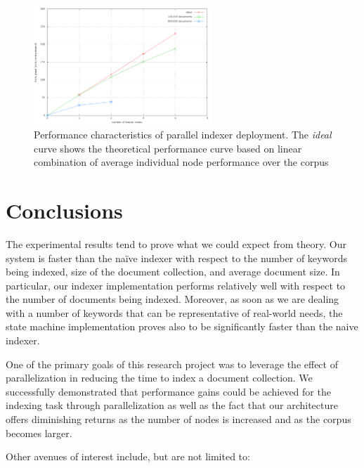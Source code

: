 \documentclass[10pt]{article}
\begin{document}
\begin{figure}
  \begin{center}
        \includegraphics[width=0.60\textwidth,height=!]{parallelization}
  \end{center}
  \caption{Performance characteristics of parallel indexer
    deployment. The \textit{ideal} curve shows the theoretical
    performance curve based on linear combination of average
    individual node performance over the corpus} 
\end{figure} 


\section{Conclusions}
\label{sec:conclusions}
The experimental results tend to prove what we could expect from
theory. Our system is faster than the na\"{i}ve indexer with respect
to the number of keywords being indexed, size of the document
collection, and average document size. In particular, our indexer
implementation performs relatively well with respect to the number of
documents being indexed. Moreover, as soon as we are dealing with a number of
keywords that can be representative of real-world needs, the state
machine implementation proves also to be significantly faster than the
naive indexer. 

One of the primary goals of this research project was to leverage the
effect of parallelization in reducing the time to index a document
collection. We successfully demonstrated that performance gains could
be achieved for the indexing task through parallelization as well as
the fact that our architecture offers diminishing returns as the
number of nodes is increased and as the corpus becomes larger.

 Other avenues of interest include, but are not limited
to:
\end{document}
